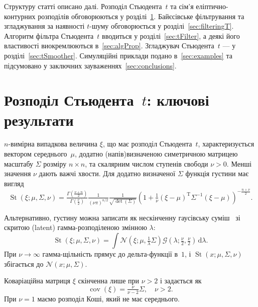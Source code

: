 \documentclass[]{article}
\newcommand{\N}{\ensuremath{\mathcal{N}}}
\newcommand{\G}{\ensuremath{\mathcal{G}}}
\newcommand{\inv}{^{-1}}
\newcommand{\T}{^{\mathrm{T}}}
\newcommand{\di}{\, \mathrm{d}}
\DeclareMathOperator{\cov}{cov}
\DeclareMathOperator{\St}{St}
\begin{document}
Структуру статті описано далі. Розподіл Стьюдента~$t$ та сім'я еліптично-контурних розподілів обговорюються у розділі~\ref{sec:distributions}. Байєсівське фільтрування та згладжування за наявності $t$-шуму обговорюється у розділі~\ref{sec:filteringT}. Алгоритм фільтра Стьюдента~$t$ вводиться у розділі~\ref{sec:tFilter}, а деякі його властивості виокремлюються в~\ref{sec:algProp}. Згладжувач Стьюдента~$t$ — у розділі~\ref{sec:tSmoother}. Симуляційні приклади подано в~\ref{sec:examples} та підсумовано у заключних зауваженнях~\ref{sec:conclusions}.

\section{Розподіл Стьюдента~$t$: ключові результати}
\label{sec:distributions}

$n$-вимірна випадкова величина $\xi$, що має розподіл Стьюдента~$t$, характеризується вектором середнього~$\mu$, додатно (напів)визначеною симетричною матрицею масштабу $\Sigma$ розміру $n\times n$, та скалярним числом ступенів свободи $\nu>0$. Менші значення $\nu$ дають важчі хвости. Для додатно визначеної $\Sigma$ функція густини має вигляд
\begin{equation}\label{eq:tDens}
\St(\xi; \mu, \Sigma, \nu)
= \tfrac{\Gamma(\frac{\nu + n}{2})}{\Gamma(\frac{\nu}{2})} \tfrac{1}{(\nu\pi)^{n/2}} \tfrac{1}{\sqrt{\det(\Sigma)}} \left(1 + \tfrac{1}{\nu} (\xi-\mu)\T \Sigma\inv(\xi-\mu) \right)^{-\frac{n+\nu}{2}}.
\end{equation}

Альтернативно, густину можна записати як нескінченну гаусівську суміш~\cite{bishop_pattern_2006} зі скритою (latent) гамма-розподіленою змінною $\lambda$:
\begin{equation}\label{eq:tDensMix}
\St(\xi; \mu, \Sigma, \nu) = \int \N(\xi; \mu, \tfrac{1}{\lambda}\Sigma) \G(\lambda; \tfrac{\nu}{2}, \tfrac{\nu}{2}) \di \lambda.
\end{equation}
При $\nu\to\infty$ гамма-щільність прямує до дельта-функції в~$1$, і $\St(x; \mu, \Sigma, \nu)$ збігається до $\N(x; \mu, \Sigma)$.

Коваріаційна матриця $\xi$ скінченна лише при $\nu>2$ і задається як
\begin{equation}
\cov(\xi) = \tfrac{\nu}{\nu-2} \Sigma, \quad \nu>2.
\end{equation}
При $\nu=1$ маємо розподіл Коші, який не має середнього.
\end{document}
